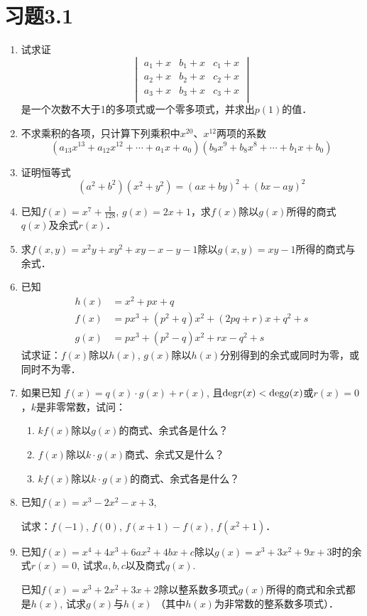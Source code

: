 \section*{习题3.1}
\begin{enumerate}
    \item 试求证
\[\begin{vmatrix}
    a_1+x &  b_1+x  &  c_1+x\\
    a_2+x &  b_2+x  &  c_2+x\\
    a_3+x &  b_3+x  &  c_3+x\\
\end{vmatrix}\]
是一个次数不大于1的多项式或一个零多项式，并求出$p(1)$的值．

\item 不求乘积的各项，只计算下列乘积中$x^{20}$、$x^{12}$两项的系数
\[(a_{13}x^{13}+a_{12}x^{12}+\cdots +a_{1}x+a_0)(b_9x^9+b_8x^8+\cdots +b_1x+b_0)\]
\item 证明恒等式
\[(a^2+b^2)(x^2+y^2)=(ax+by)^2+(bx-ay)^2\]

\item 已知$f(x)=x^7+\frac{1}{128}$, $g(x)=2x+1$，求$f(x)$除以$g(x)$所得的商式$q(x)$及余式$r(x)$．

\item 求$f(x,y)=x^2y+xy^2+xy-x-y-1$除以$g(x,y)=xy-1$所得的商式与余式．
\item 已知
\[\begin{split}
h(x)&=x^2+px+q\\
f(x)&=px^3+(p^2+q)x^2+(2pq+r)x+q^2+s\\
g(x)&=px^3+(p^2-q)x^2+rx-q^2+s
\end{split}\]
试求证：$f(x)$除以$h(x)$, $g(x)$除以$h(x)$分别得到的余式或同时为零，或同时不为零．

\item 如果已知
$f(x)=q(x)\cdot g(x)+r(x)$, 且${\rm deg}r(x)<{\rm deg}g(x)$或$r(x)=0$，$k$是非零常数，试问：
\begin{enumerate}
    \item $kf(x)$除以$g(x)$的商式、余式各是什么？
    \item $f(x)$除以$k\cdot g(x)$商式、余式又是什么？
    \item  $kf(x)$除以$k\cdot g(x)$的商式、余式各是什么？    
\end{enumerate}


\item 已知$f(x)=x^3-2x^2-x+3$, 

试求：$f(-1)$, $f(0)$, $f (x+1) -f (x)$, $f (x^2+1)$．

\item 已知$f(x)=x^4+4x^3+6ax^2+4bx+c$除以$g(x)=x^3+3x^2+9x+3$时的余式$r(x)=0$, 试求$a,b,c$以及商式$q(x)$.

\staritem 已知$f(x)=x^3+2x^2+3x+2$除以整系数多项式$g(x)$所得的商式和余式都是$h(x)$, 试求$g(x)$与$h(x)$ （其中$h(x)$为非常数的整系数多项式）．
\end{enumerate}


